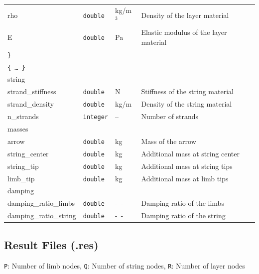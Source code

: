 \documentclass[12pt]{article}
\begin{document}
\begin{table}[H]
{\begin{tabular}{ l | l | l | l }
\quad\quad rho & \texttt{double} & \unit[]{kg/m$^3$} & Density of the layer material \\
\quad\quad E & \texttt{double} & \unit[]{Pa} & Elastic modulus of the layer material \\
\quad \texttt{\}} & & & \\
\quad\texttt{\{\ \ldots\ \}} & & & \\
\tablespace string & & & \\
\quad strand\_stiffness & \texttt{double} & \unit[]{N} & Stiffness of the string material\\
\quad strand\_density & \texttt{double} & \unit[]{kg/m} & Density of the string material \\
\quad n\_strands & \texttt{integer} & -- & Number of strands \\
\tablespace masses & & & \\
\quad arrow & \texttt{double} & \unit[]{kg} & Mass of the arrow \\
\quad string\_center & \texttt{double} & \unit[]{kg} & Additional mass at string center \\
\quad string\_tip & \texttt{double} & \unit[]{kg} & Additional mass at string tips \\
\quad limb\_tip & \texttt{double} & \unit[]{kg} & Additional mass at limb tips \\
\tablespace damping & & & \\
\quad damping\_ratio\_limbs & \texttt{double} & \unit[]{--} & Damping ratio of the limbs \\
\quad damping\_ratio\_string & \texttt{double} & \unit[]{--} & Damping ratio of the string
\end{tabular}}
\end{table}

\newpage
\subsection{Result Files (.res)}
\label{sec:output-structure}

\footnotesize{
\texttt{P}: Number of limb nodes, \texttt{Q}: Number of string nodes, \texttt{R}: Number of layer nodes
}
\end{document}
